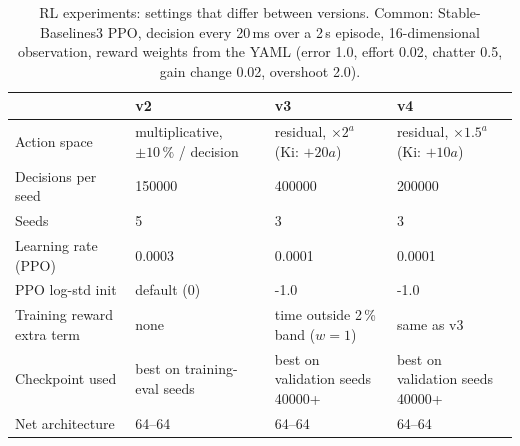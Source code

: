 \begin{table}[t]
\centering
\small
\caption{RL experiments: settings that differ between versions. Common: Stable-Baselines3 PPO, decision every 20\,ms over a 2\,s episode, 16-dimensional observation, reward weights from the YAML (error 1.0, effort 0.02, chatter 0.5, gain change 0.02, overshoot 2.0).}
\label{tab:hparams}
\begin{tabular}{llll}
\toprule
 & v2 & v3 & v4\\
\midrule
Action space & multiplicative, $\pm10\,\%$ / decision & residual, $\times2^{a}$ (Ki: $+20a$) & residual, $\times1.5^{a}$ (Ki: $+10a$)\\
Decisions per seed & 150000 & 400000 & 200000\\
Seeds & 5 & 3 & 3\\
Learning rate (PPO) & 0.0003 & 0.0001 & 0.0001\\
PPO log-std init & default (0) & -1.0 & -1.0\\
Training reward extra term & none & time outside 2\,\% band ($w=1$) & same as v3\\
Checkpoint used & best on training-eval seeds & best on validation seeds 40000+ & best on validation seeds 40000+\\
Net architecture & 64--64 & 64--64 & 64--64\\
\bottomrule
\end{tabular}
\end{table}
